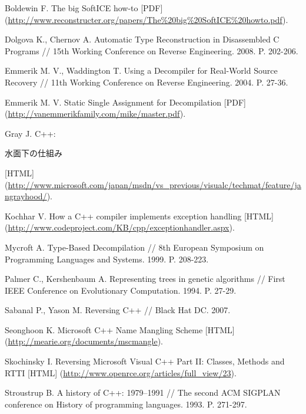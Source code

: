 \newpage
\raggedright
{}
\begin{thebibliography}{99}
Boldewin F. The big SoftICE how-to [PDF] (\url{http://www.reconstructer.org/papers/The%20big%20SoftICE%20howto.pdf}).

Dolgova K., Chernov A. Automatic Type Reconstruction in Disassembled C Programs // 15th Working Conference on Reverse Engineering. 2008. P. 202-206.

Emmerik M. V., Waddington T. Using a Decompiler for Real-World Source Recovery // 11th Working Conference on Reverse Engineering. 2004. P. 27-36.

Emmerik M. V. Static Single Assignment for Decompilation [PDF] (\url{http://vanemmerikfamily.com/mike/master.pdf}).

Gray J. C++: {\begin{CJK*}{UTF8}{ipam}水面下の仕組み\end{CJK*}} [HTML] (\url{http://www.microsoft.com/japan/msdn/vs_previous/visualc/techmat/feature/jangrayhood/}).

Kochhar V. How a C++ compiler implements exception handling [HTML] (\url{http://www.codeproject.com/KB/cpp/exceptionhandler.aspx}).

Mycroft A. Type-Based Decompilation // 8th European Symposium on Programming Languages and Systems. 1999. P. 208-223.

Palmer C., Kershenbaum A. Representing trees in genetic algorithms // First IEEE Conference on Evolutionary Computation. 1994. P. 27-29.

Sabanal P., Yason M. Reversing C++ // Black Hat DC. 2007.

Seonghoon K. Microsoft C++ Name Mangling Scheme [HTML] (\url{http://mearie.org/documents/mscmangle}).

Skochinsky I. Reversing Microsoft Visual C++ Part II: Classes, Methods and RTTI [HTML] (\url{http://www.openrce.org/articles/full_view/23}).

Stroustrup B. A history of C++: 1979–1991 // The second ACM SIGPLAN conference on History of programming languages. 1993. P. 271-297.


\end{thebibliography}
